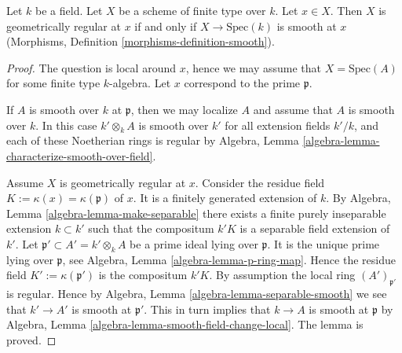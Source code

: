 \begin{lemma}
\label{lemma-geometrically-regular-smooth}
Let $k$ be a field.
Let $X$ be a scheme of finite type over $k$.
Let $x \in X$.
Then $X$ is geometrically regular at $x$ if and only if $X \to \text{Spec}(k)$
is smooth at $x$ (Morphisms, Definition \ref{morphisms-definition-smooth}).
\end{lemma}

\begin{proof}
The question is local around $x$,
hence we may assume that $X = \text{Spec}(A)$
for some finite type $k$-algebra.
Let $x$ correspond to the prime $\mathfrak p$.

\medskip\noindent
If $A$ is smooth over $k$ at $\mathfrak p$, then we may localize $A$
and assume that $A$ is smooth over $k$. In this case $k' \otimes_k A$
is smooth over $k'$ for all extension fields $k'/k$, and each of
these Noetherian rings is regular by
Algebra, Lemma \ref{algebra-lemma-characterize-smooth-over-field}.

\medskip\noindent
Assume $X$ is geometrically regular at $x$.
Consider the residue field $K := \kappa(x) = \kappa(\mathfrak p)$ of $x$.
It is a finitely generated extension of $k$.
By Algebra, Lemma \ref{algebra-lemma-make-separable}
there exists a finite purely inseparable
extension $k \subset k'$ such that the compositum
$k'K$ is a separable field extension of $k'$.
Let $\mathfrak p' \subset A' = k' \otimes_k A$ be a prime ideal
lying over $\mathfrak p$. It is the unique prime lying over $\mathfrak p$, see
Algebra, Lemma \ref{algebra-lemma-p-ring-map}.
Hence the residue field $K' := \kappa(\mathfrak p')$
is the compositum $k'K$. By assumption the local ring
$(A')_{\mathfrak p'}$ is regular. Hence by
Algebra, Lemma \ref{algebra-lemma-separable-smooth}
we see that $k' \to A'$ is smooth at $\mathfrak p'$.
This in turn implies that $k \to A$ is smooth at $\mathfrak p$ by
Algebra, Lemma \ref{algebra-lemma-smooth-field-change-local}.
The lemma is proved.
\end{proof}


